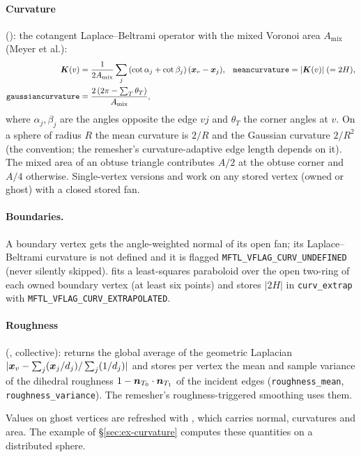 \paragraph{Curvature} (): the cotangent Laplace--Beltrami
operator with the mixed Voronoi area $A_{\text{mix}}$ (Meyer et al.):
\begin{align}
  \boldsymbol{K}(v) &= \frac{1}{2A_{\text{mix}}}\sum_{j}\left(\cot\alpha_{j}+\cot\beta_{j}\right)(\boldsymbol{x}_v-\boldsymbol{x}_j),
  &\texttt{meancurvature} &= \lvert\boldsymbol{K}(v)\rvert \;(=2H),\\
  \texttt{gaussiancurvature} &= \frac{2\,(2\pi-\sum_{T}\theta_T)}{A_{\text{mix}}},
\end{align}
where $\alpha_j,\beta_j$ are the angles opposite the edge $vj$ and $\theta_T$ the corner angles at
$v$. On a sphere of radius $R$ the mean curvature is $2/R$ and the Gaussian curvature $2/R^2$
(the \mftlone{} convention; the remesher's curvature-adaptive edge length depends on it). The
mixed area of an obtuse triangle contributes $A/2$ at the obtuse corner and $A/4$ otherwise.
Single-vertex versions  and  work on
any stored vertex (owned or ghost) with a closed stored fan.

\paragraph{Boundaries.} A boundary vertex gets the angle-weighted normal of its open fan; its
Laplace--Beltrami curvature is not defined and it is flagged
\texttt{MFTL\_VFLAG\_CURV\_UNDEFINED} (never silently skipped).
 fits a least-squares paraboloid over the open two-ring of
each owned boundary vertex (at least six points) and stores $\lvert2H\rvert$ in
\texttt{curv\_extrap} with \texttt{MFTL\_VFLAG\_CURV\_EXTRAPOLATED}.

\paragraph{Roughness} (, collective): returns the global average of the
geometric Laplacian $\lvert\boldsymbol{x}_v-\sum_j(\boldsymbol{x}_j/d_j)/\sum_j(1/d_j)\rvert$ and stores per
vertex the mean and sample variance of the dihedral roughness $1-\boldsymbol{n}_{T_0}\cdot\boldsymbol{n}_{T_1}$
of the incident edges (\texttt{roughness\_mean}, \texttt{roughness\_variance}). The remesher's
roughness-triggered smoothing uses them.

Values on ghost vertices are refreshed with , which carries normal,
curvatures and area. The example of \S\ref{sec:ex-curvature} computes these quantities on a
distributed sphere.
